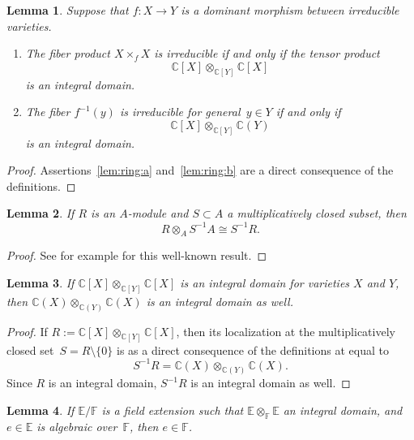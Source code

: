 \documentclass[12pt]{article}
\newtheorem{lemma}{Lemma}
\theoremstyle{definition}
\newenvironment{claims}{\begin{enumerate}[topsep=0pt,itemsep=0pt,leftmargin=8mm,label=\textnormal{\textbf{(\alph*)}},ref=(\alph*)]}{\end{enumerate}}
\newcommand{\st}{such that }
\renewcommand{\c}{\colon}
\newcommand{\C}{{\mathbb{C}}}
\newcommand{\F}{{\mathbb{F}}}
\newcommand{\E}{{\mathbb{E}}}
\begin{document}
\begin{lemma}
\label{lem:ring}
Suppose that $f\c X\to Y$ is a dominant morphism between irreducible varieties.
\begin{claims}
\item\label{lem:ring:a}
The fiber product $X\times_f X$ is irreducible
if and only if
the tensor product
\[
\C[X]\otimes_{\C[Y]}\C[X]
\]
is an integral domain.
\item\label{lem:ring:b}
The fiber $f^{-1}(y)$ is irreducible for general~$y\in Y$
if and only if
\[
\C[X]\otimes_{\C[Y]}\C(Y)
\]
is an integral domain.
\end{claims}
\end{lemma}

\begin{proof}
Assertions~\ref{lem:ring:a} and~\ref{lem:ring:b} are a direct consequence of the
definitions.
\end{proof}

\begin{lemma}
\label{lem:tensor}
If $R$ is an $A$-module and $S\subset A$ a multiplicatively closed subset,
then
\[
R\otimes_A S^{-1}A\cong S^{-1}R.
\]
\end{lemma}

\begin{proof}
See for example \citep[Proposition~3.5]{1969} for this well-known result.
\end{proof}



\begin{lemma}
\label{lem:step1}
If $\C[X]\otimes_{\C[Y]}\C[X]$ is an integral domain for varieties $X$ and $Y$,
then $\C(X)\otimes_{\C(Y)}\C(X)$
is an integral domain as well.
\end{lemma}

\begin{proof}
If $R:=\C[X]\otimes_{\C[Y]}\C[X]$, then its localization at the multiplicatively closed set~$S=R\setminus\{0\}$
is as a direct consequence of the definitions at \citep[Ch.~3]{1969} equal to
\[
S^{-1}R=\C(X)\otimes_{\C(Y)}\C(X).
\]
Since $R$ is an integral domain, $S^{-1}R$ is an integral domain as well.
\end{proof}


\begin{lemma}
\label{lem:step2}
If $\E/\F$ is a field extension \st
$\E\otimes_\F \E$ an integral domain,
and $e\in \E$ is algebraic over~$\F$, then $e\in \F$.
\end{lemma}
\end{document}

